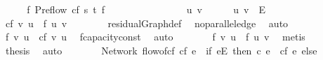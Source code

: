 \begin{isabellebody}
\ \ \isamarkupfalse%
\ \isamarkupfalse%
\ f{\isacharprime}{\isacharcolon}\ Preflow\ cf\ s\ t\ f{\isacharprime}\ \isacommand{{\isachardot}}\isamarkupfalse%
\isanewline
\ \ \ \ \ \ \isanewline
\ \ \isacommand{{\isacharbraceleft}}\isamarkupfalse%
\isanewline
\ \ \ \ \isamarkupfalse%
\ u\ v\isanewline
\ \ \ \ \isamarkupfalse%
\ {\isachardoublequoteopen}{\isacharparenleft}u{\isacharcomma}\ v{\isacharparenright}\ {\isasymin}\ E{\isachardoublequoteclose}\isanewline
\ \ \ \ \isanewline
\ \ \ \ \isamarkupfalse%
\ \isamarkupfalse%
\ {\isachardoublequoteopen}cf\ {\isacharparenleft}v{\isacharcomma}\ u{\isacharparenright}\ {\isacharequal}\ f\ {\isacharparenleft}u{\isacharcomma}\ v{\isacharparenright}{\isachardoublequoteclose}\isanewline
\ \ \ \ \ \ \isamarkupfalse%
\ residualGraph{\isacharunderscore}def\ \isamarkupfalse%
\ no{\isacharunderscore}parallel{\isacharunderscore}edge\ \isamarkupfalse%
\ auto\isanewline
\ \ \ \ \isamarkupfalse%
\ \isamarkupfalse%
\ {\isachardoublequoteopen}f{\isacharprime}\ {\isacharparenleft}v{\isacharcomma}\ u{\isacharparenright}\ {\isasymle}\ cf\ {\isacharparenleft}v{\isacharcomma}\ u{\isacharparenright}{\isachardoublequoteclose}\ \isamarkupfalse%
\ f{\isacharprime}{\isachardot}capacity{\isacharunderscore}const\ \isamarkupfalse%
\ auto\isanewline
\ \ \ \ \isamarkupfalse%
\ \isamarkupfalse%
\ {\isachardoublequoteopen}f{\isacharprime}\ {\isacharparenleft}v{\isacharcomma}\ u{\isacharparenright}\ {\isasymle}\ f\ {\isacharparenleft}u{\isacharcomma}\ v{\isacharparenright}{\isachardoublequoteclose}\ \isamarkupfalse%
\ metis\isanewline
\ \ \isacommand{{\isacharbraceright}}\isamarkupfalse%
\isanewline
\ \ \isamarkupfalse%
\ {\isacharquery}thesis\ \isamarkupfalse%
\ auto\isanewline
{}\isamarkupfalse%
%
\endisatagproof
{\isafoldproof}%
%
\isadelimproof
\ \ \isanewline
%
\endisadelimproof
\isanewline
\ \ \isanewline
{}\isamarkupfalse%
\ {\isacharparenleft}\ Network{\isacharparenright}\ {\isachardoublequoteopen}flow{\isacharunderscore}of{\isacharunderscore}cf\ cf\ e\ {\isasymequiv}\ {\isacharparenleft}if\ {\isacharparenleft}e{\isasymin}E{\isacharparenright}\ then\ c\ e\ {\isacharminus}\ cf\ e\ else\ {}{\isacharparenright}{\isachardoublequoteclose}\isanewline
\isanewline
\ \ \isanewline

\end{isabellebody}

